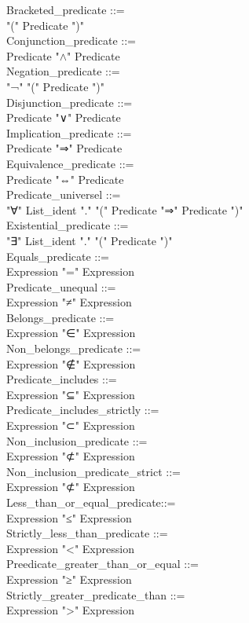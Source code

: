 \documentclass[12pt,a4paper,draft]{report}
\begin{document}
{\begin{sloppypar}
Bracketed\_predicate ::= \\
  "("  Predicate  ")" \\
Conjunction\_predicate ::= \\
   Predicate  "$\land$"  Predicate\\
Negation\_predicate ::= \\
  "¬" "(" Predicate ")" \\
Disjunction\_predicate ::= \\
   Predicate  "∨"  Predicate\\
Implication\_predicate ::= \\
   Predicate  "⇒"  Predicate\\
Equivalence\_predicate ::= \\
   Predicate  "⇔"  Predicate\\
Predicate\_universel ::= \\
  "∀" List\_ident "." "(" Predicate  "⇒"  Predicate ")" \\
Existential\_predicate ::= \\
  "∃" List\_ident "." "(" Predicate ")" \\
Equals\_predicate ::= \\
   Expression  "="  Expression\\
Predicate\_unequal ::= \\
   Expression  "≠"  Expression \\
Belongs\_predicate ::= \\
   Expression  "∈"  Expression\\
Non\_belongs\_predicate ::= \\
   Expression  "∉"  Expression\\
Predicate\_includes ::= \\
   Expression  "⊆"  Expression\\
Predicate\_includes\_strictly  ::= \\
   Expression  "⊂"  Expression\\
Non\_inclusion\_predicate ::= \\
   Expression  "⊄"  Expression\\
Non\_inclusion\_predicate\_strict ::= \\
   Expression  "⊄"  Expression   \\
Less\_than\_or\_equal\_predicate::= \\
   Expression  "≤"  Expression\\
Strictly\_less\_than\_predicate ::= \\
   Expression  "<"  Expression\\
Preedicate\_greater\_than\_or\_equal ::= \\
   Expression  "≥"  Expression\\
Strictly\_greater\_predicate\_than ::= \\
   Expression  ">"  Expression\\


\end{sloppypar}}
\end{document}
